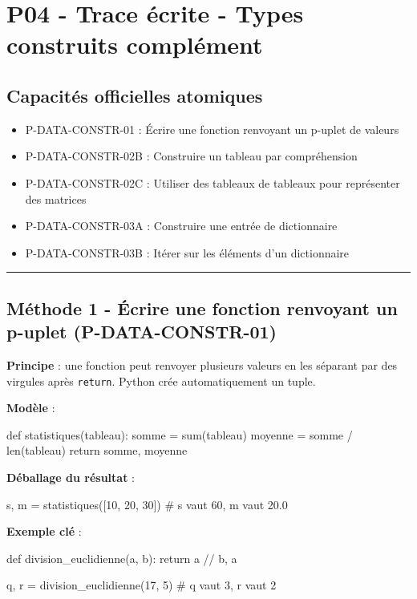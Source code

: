 \section{P04 - Trace écrite - Types construits complément}

\subsection{Capacités officielles atomiques}

\begin{itemize}
\tightlist
\item
  P-DATA-CONSTR-01 : Écrire une fonction renvoyant un p-uplet de valeurs
\item
  P-DATA-CONSTR-02B : Construire un tableau par compréhension
\item
  P-DATA-CONSTR-02C : Utiliser des tableaux de tableaux pour représenter
  des matrices
\item
  P-DATA-CONSTR-03A : Construire une entrée de dictionnaire
\item
  P-DATA-CONSTR-03B : Itérer sur les éléments d'un dictionnaire
\end{itemize}

\begin{center}\rule{0.5\linewidth}{0.5pt}\end{center}

\subsection{Méthode 1 - Écrire une fonction renvoyant un p-uplet (P-DATA-CONSTR-01)}

\textbf{Principe} : une fonction peut renvoyer plusieurs valeurs en les
séparant par des virgules après \texttt{return}. Python crée
automatiquement un tuple.

\textbf{Modèle} :

\begin{python}
def statistiques(tableau):
    somme = sum(tableau)
    moyenne = somme / len(tableau)
    return somme, moyenne
\end{python}

\textbf{Déballage du résultat} :

\begin{python}
s, m = statistiques([10, 20, 30])
# s vaut 60, m vaut 20.0
\end{python}

\textbf{Exemple clé} :

\begin{python}
def division_euclidienne(a, b):
    return a // b, a %

q, r = division_euclidienne(17, 5)
# q vaut 3, r vaut 2
\end{python}

